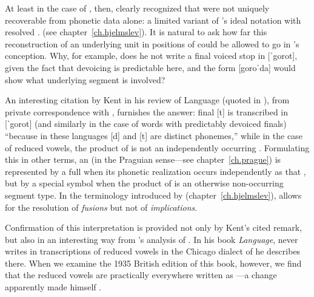 At least in the case of , then, {\Bloomfield} clearly
recognized  that were not uniquely recoverable
from phonetic data alone: a limited variant of {\Hjelmslev}'s ideal
notation with resolved . (see
chapter~\ref{ch.hjelmslev}). It is natural to ask how far this
reconstruction of an underlying unit in positions of 
could be allowed to go in {\Bloomfield}'s conception. Why, for example,
does he not write a final voiced stop in  [ˈgorot], given the
fact that devoicing is predictable here, and the form [goroˈda] would
show what underlying segment is involved?

An interesting citation by Kent in his review of Language (quoted in
\citealt[271]{hockett70:bloomfield.anthology}), from private
correspondence with {\Bloomfield}, furnishes the answer: final [t] is
transcribed in [ˈgorot] (and similarly in the case of  words
with predictably devoiced finals) ``because in these languages [d] and
[t] are distinct phonemes,'' while in the case of reduced vowels, the
product of  is not an independently occurring
. Formulating this in other terms, an  (in the
Praguian sense—see chapter~\ref{ch.prague}) is represented by a full
 when its phonetic realization occurs independently as that
, but by a special symbol when the product of  is
an otherwise non-occurring segment type. In the terminology introduced
by {\Hjelmslev} (chapter~\ref{ch.hjelmslev}), {\Bloomfield} allows for the
resolution of \emph{fusions} but not of \emph{implications}.

Confirmation of this interpretation is provided not only by Kent's
cited remark, but also in an interesting way from {\Bloomfield}'s
analysis of . In his book \emph{Language}, {\Bloomfield} never
writes  in transcriptions of reduced vowels in the Chicago
dialect of  he describes there. When we examine the 1935
British edition of this book, however, we find that the reduced vowels
are practically everywhere written as —a change {\Bloomfield}
apparently made himself \citep{smith91:language.revisions}.

